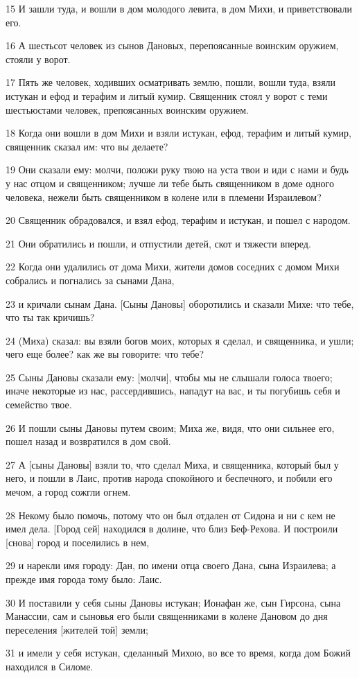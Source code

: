 \par 15 И зашли туда, и вошли в дом молодого левита, в дом Михи, и приветствовали его.
\par 16 А шестьсот человек из сынов Дановых, перепоясанные воинским оружием, стояли у ворот.
\par 17 Пять же человек, ходивших осматривать землю, пошли, вошли туда, взяли истукан и ефод и терафим и литый кумир. Священник стоял у ворот с теми шестьюстами человек, препоясанных воинским оружием.
\par 18 Когда они вошли в дом Михи и взяли истукан, ефод, терафим и литый кумир, священник сказал им: что вы делаете?
\par 19 Они сказали ему: молчи, положи руку твою на уста твои и иди с нами и будь у нас отцом и священником; лучше ли тебе быть священником в доме одного человека, нежели быть священником в колене или в племени Израилевом?
\par 20 Священник обрадовался, и взял ефод, терафим и истукан, и пошел с народом.
\par 21 Они обратились и пошли, и отпустили детей, скот и тяжести вперед.
\par 22 Когда они удалились от дома Михи, жители домов соседних с домом Михи собрались и погнались за сынами Дана,
\par 23 и кричали сынам Дана. [Сыны Дановы] оборотились и сказали Михе: что тебе, что ты так кричишь?
\par 24 (Миха) сказал: вы взяли богов моих, которых я сделал, и священника, и ушли; чего еще более? как же вы говорите: что тебе?
\par 25 Сыны Дановы сказали ему: [молчи], чтобы мы не слышали голоса твоего; иначе некоторые из нас, рассердившись, нападут на вас, и ты погубишь себя и семейство твое.
\par 26 И пошли сыны Дановы путем своим; Миха же, видя, что они сильнее его, пошел назад и возвратился в дом свой.
\par 27 А [сыны Дановы] взяли то, что сделал Миха, и священника, который был у него, и пошли в Лаис, против народа спокойного и беспечного, и побили его мечом, а город сожгли огнем.
\par 28 Некому было помочь, потому что он был отдален от Сидона и ни с кем не имел дела. [Город сей] находился в долине, что близ Беф-Рехова. И построили [снова] город и поселились в нем,
\par 29 и нарекли имя городу: Дан, по имени отца своего Дана, сына Израилева; а прежде имя города тому было: Лаис.
\par 30 И поставили у себя сыны Дановы истукан; Ионафан же, сын Гирсона, сына Манассии, сам и сыновья его были священниками в колене Дановом до дня переселения [жителей той] земли;
\par 31 и имели у себя истукан, сделанный Михою, во все то время, когда дом Божий находился в Силоме.

